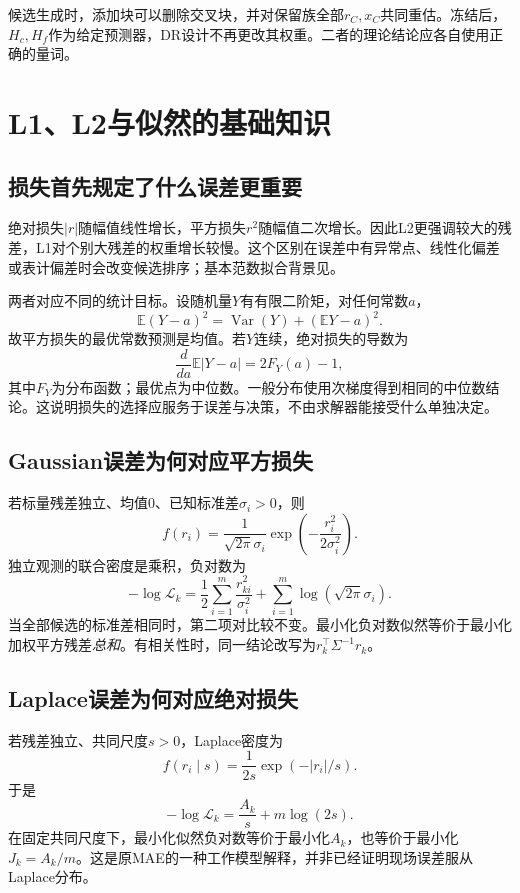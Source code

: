 \documentclass[UTF8,11pt,a4paper,fontset=fandol]{ctexart}
\newcommand{\E}{\mathbb E}
\newcommand{\Var}{\operatorname{Var}}
\numberwithin{equation}{section}
\begin{document}
候选生成时，添加块可以删除交叉块，并对保留族全部$r_C,x_C$共同重估。冻结后，$H_c,H_f$作为给定预测器，DR设计不再更改其权重。二者的理论结论应各自使用正确的量词。

\section{L1、L2与似然的基础知识}
\label{sec:loss}
\subsection{损失首先规定了什么误差更重要}
绝对损失$|r|$随幅值线性增长，平方损失$r^2$随幅值二次增长。因此L2更强调较大的残差，L1对个别大残差的权重增长较慢。这个区别在误差中有异常点、线性化偏差或表计偏差时会改变候选排序；基本范数拟合背景见\citet[第6章]{boyd2004}。

两者对应不同的统计目标。设随机量$Y$有有限二阶矩，对任何常数$a$，
\begin{equation}
\E(Y-a)^2=\Var(Y)+(\E Y-a)^2.
\label{eq:mean}
\end{equation}
故平方损失的最优常数预测是均值。若$Y$连续，绝对损失的导数为
\begin{equation}
\frac{d}{da}\E|Y-a|=2F_Y(a)-1,
\label{eq:median}
\end{equation}
其中$F_Y$为分布函数；最优点为中位数。一般分布使用次梯度得到相同的中位数结论。这说明损失的选择应服务于误差与决策，不由求解器能接受什么单独决定。

\subsection{Gaussian误差为何对应平方损失}
若标量残差独立、均值0、已知标准差$\sigma_i>0$，则
\begin{equation}
f(r_i)=\frac{1}{\sqrt{2\pi}\sigma_i}
\exp\!\left(-\frac{r_i^2}{2\sigma_i^2}\right).
\end{equation}
独立观测的联合密度是乘积，负对数为
\begin{equation}
-\log\mathcal L_k
=\frac12\sum_{i=1}^m\frac{r_{ki}^2}{\sigma_i^2}
+\sum_{i=1}^m\log(\sqrt{2\pi}\sigma_i).
\label{eq:gaussnll}
\end{equation}
当全部候选的标准差相同时，第二项对比较不变。最小化负对数似然等价于最小化加权平方残差\emph{总和}。有相关性时，同一结论改写为$r_k^\top\Sigma^{-1}r_k$。

\subsection{Laplace误差为何对应绝对损失}
若残差独立、共同尺度$s>0$，Laplace密度为
\begin{equation}
f(r_i\mid s)=\frac{1}{2s}\exp(-|r_i|/s).
\end{equation}
于是
\begin{equation}
-\log\mathcal L_k=\frac{A_k}{s}+m\log(2s).
\label{eq:lapnll}
\end{equation}
在固定共同尺度下，最小化似然负对数等价于最小化$A_k$，也等价于最小化$J_k=A_k/m$。这是原MAE的一种工作模型解释，并非已经证明现场误差服从Laplace分布。
\end{document}
